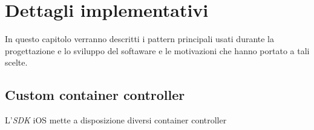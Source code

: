\chapter{Dettagli implementativi}

In questo capitolo verranno descritti i pattern principali usati durante la progettazione e lo sviluppo del softaware e le motivazioni che hanno portato a tali scelte.

\section{Custom container controller}
L'\emph{SDK} iOS mette a disposizione diversi container controller